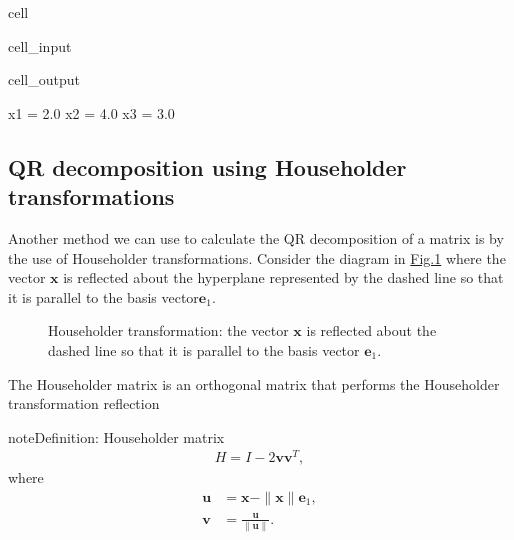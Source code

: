 \documentclass[letterpaper,10pt,english]{jupyterBook}
\begin{document}
\begin{sphinxuseclass}{cell}
\begin{sphinxVerbatimInput}
\begin{sphinxuseclass}{cell_input}
\end{sphinxuseclass}\end{sphinxVerbatimInput}
\begin{sphinxVerbatimOutput}

\begin{sphinxuseclass}{cell_output}
\begin{sphinxVerbatim}[commandchars=\\\{\}]
x1 = \PYGZhy{}2.0
x2 = 4.0
x3 = 3.0
\end{sphinxVerbatim}

\end{sphinxuseclass}\end{sphinxVerbatimOutput}

\end{sphinxuseclass}

\subsection{QR decomposition using Householder transformations}
\label{\detokenize{6_Direct_methods/6.4_QR_decomposition:qr-decomposition-using-householder-transformations}}\label{\detokenize{6_Direct_methods/6.4_QR_decomposition:qr-householder-section}}
\sphinxAtStartPar
Another method we can use to calculate the QR decomposition of a matrix is by the use of Householder transformations. Consider the diagram in \hyperref[\detokenize{6_Direct_methods/6.4_QR_decomposition:householder-1-figure}]{Fig.\@ \ref{\detokenize{6_Direct_methods/6.4_QR_decomposition:householder-1-figure}}} where the vector \(\mathbf{x}\) is reflected about the hyperplane represented by the dashed line so that it is parallel to the basis vector\(\mathbf{e}_1\).

\begin{figure}[htbp]
\centering
\capstart

\noindent{}
\caption{Householder transformation: the vector \(\mathbf{x}\) is reflected about the dashed line so that it is parallel to the basis vector \(\mathbf{e}_1\).}\label{\detokenize{6_Direct_methods/6.4_QR_decomposition:householder-1-figure}}\end{figure}

\sphinxAtStartPar
The Householder matrix is an orthogonal matrix that performs the Householder transformation reflection

\begin{sphinxadmonition}{note}{Definition: Householder matrix}
\begin{equation}\label{equation:6_Direct_methods/6.4_QR_decomposition:householder-equation}
\begin{split}H = I - 2 \mathbf{v} \mathbf{v}^T,\end{split}
\end{equation}
\sphinxAtStartPar
where
\begin{align*}
    \mathbf{u} &= \mathbf{x} - \|\mathbf{x}\| \mathbf{e}_1, \\
    \mathbf{v} &= \frac{\mathbf{u}}{\| \mathbf{u} \|}.
\end{align*}\end{sphinxadmonition}
\end{document}
